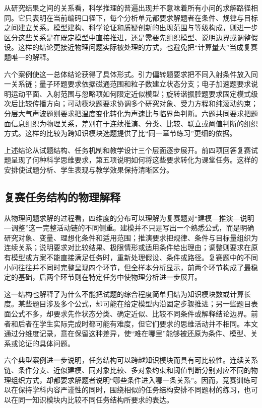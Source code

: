 \documentclass[
  12pt,
  a4paper]{ctexbook}
\begin{document}
从研究结果之间的关系看，科学推理的普遍出现并不意味着所有小问的求解路径相同。它只表明在当前编码口径下，每个分析单元都要求解题者在条件、规律与目标之间建立关系。模型建构、科学论证和质疑创新的出现范围与等级构成，则进一步区分这些关系是在既定模型中直接推进，还是需要先组织模型、说明边界或调整假设。这样的结论更接近物理问题实际被处理的方式，也避免把``计算量大''当成复赛题唯一的解释。

六个案例使这一总体结论获得了具体形式。引力偏转题要求把不同入射条件放入同一关系链；量子环题要求依据磁通范围和粒子数建立状态分支；电子加速题要求说明运动平面、入射范围与忽略项如何限定近似模型；旋转谐振腔题要求固定模式级次后比较传播方向；可动楔块题要求协调多个研究对象、受力方程和纯滚动约束；分层大气声波题则要求把温度变化转化为声速比与临界角判断。六题共同要求把题面信息组织为物理关系，差别在于连续推演、分类、比较、联立或阈值判断的组织方式。这样的比较为跨知识模块选题提供了比``同一章节练习''更细的依据。

上述结论从试题结构、任务机制和教学设计三个层面逐步展开。前四项回答复赛试题呈现了何种科学思维要求，第五项说明如何将这些要求转化为课堂任务。这样的安排使试题分析、学生表现与教学效果保持清晰区分。

\subsection{复赛任务结构的物理解释}\label{ux590dux8d5bux4efbux52a1ux7ed3ux6784ux7684ux7269ux7406ux89e3ux91ca}

从物理问题求解的过程看，四维度的分布可以理解为复赛题对``建模---推演---说明---调整''这一完整活动链的不同侧重。建模并不只是写出一个熟悉公式，而是明确研究对象、变量、理想化条件和适用范围；推演要求把规律、条件与目标量组织为连续关系；说明要求对比较结果、极限情形或适用条件给出理由；调整则要求在原有模型或方案不能直接满足任务时，重新处理假设、条件或路径。复赛题中的不同小问往往并不同时完整呈现四个环节，但全样本分析显示，前两个环节构成了最稳定的基础，后两个环节则在特定任务中使物理分析进一步展开。

这一结构也解释了为什么不能把试题的综合程度简单归结为知识模块数或计算长度。某些题目涉及多个公式，却可能在给定模型内沿固定步骤推进；另一些题目表面公式不多，却要求先作状态分类、确定近似、比较不同条件或解释结论边界。前者和后者在学生实际完成时都可能有难度，但它们要求的思维活动并不相同。本文通过分维度记录，意在保留这种差异，使``难在哪里''能够被还原为条件、模型、关系或论证的具体问题。

六个典型案例进一步说明，任务结构可以跨越知识模块而具有可比较性。连续关系链、条件分支、近似建模、同对象比较、多对象约束和阈值判断分别对应不同的物理组织方式，却都要求解题者说明``哪些条件进入哪一条关系''。因而，竞赛训练可以在保持学科内容严谨性的同时，围绕相似的任务结构安排不同题材的练习，也可以在同一知识模块内比较不同任务结构所要求的表达。
\end{document}
